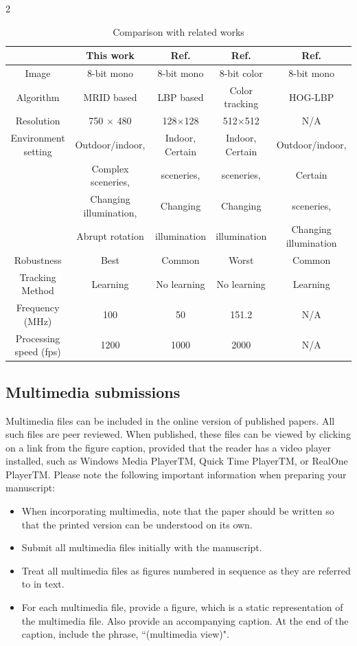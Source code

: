 \documentclass[fleqn]{2026SCGE}
\begin{document}
\begin{multicols}{2}
\begin{table}[t]
\footnotesize
\caption{Comparison with related works}
\label{tab4}
\tabcolsep 18pt %
\begin{tabular*}{\textwidth}{ccccc}
	\toprule
	&This work &{Ref. \cite{ref1}} & {Ref. \cite{ref2}}& {Ref. \cite{ref12,ref13}}\\\hline
	Image& 8-bit mono& 8-bit mono& 8-bit color & 8-bit mono\\
	Algorithm& MRID based& LBP based& Color tracking& HOG-LBP\\
	Resolution&{750 $\times$ 480 }& {128$\times$128} & {512$\times$512} &N/A \\
	Environment setting& Outdoor/indoor,  & Indoor, Certain  &Indoor, Certain  &Outdoor/indoor, \\
	&Complex sceneries,&sceneries,&sceneries,&Certain \\
	&Changing illumination, &Changing &Changing &sceneries, \\
	&Abrupt rotation&illumination&illumination&Changing illumination\\
	Robustness&Best &Common & Worst& Common\\
	Tracking Method&Learning & No learning& No learning& Learning\\
	{Frequency (MHz)}& {100}&{50} &{151.2} &{N/A} \\
	{Processing speed (fps)}&1200 &1000 &2000 &N/A \\
	\bottomrule
\end{tabular*}
\end{table}


\subsection{Multimedia submissions}
Multimedia files can be included in the online version of published papers. All such files are peer reviewed. When published, these files can be viewed by clicking on a link from the figure caption, provided that the reader has a video player installed, such as Windows Media PlayerTM, Quick Time PlayerTM, or RealOne PlayerTM. Please note the following important information when preparing your manuscript:
\begin{itemize}
	\item When incorporating multimedia, note that the paper should be written so that the printed version can be understood on its own.\vspace*{-2mm}
	\item Submit all multimedia files initially with the manuscript.\vspace*{-2mm}
	\item Treat all multimedia files as figures numbered in sequence as they are referred to in text.\vspace*{-2mm}
	\item For each multimedia file, provide a figure, which is a static representation of the multimedia file. Also provide an accompanying caption. At the end of the caption, include the phrase, ``(multimedia view)".
\end{itemize}


\end{multicols}
\end{document}
